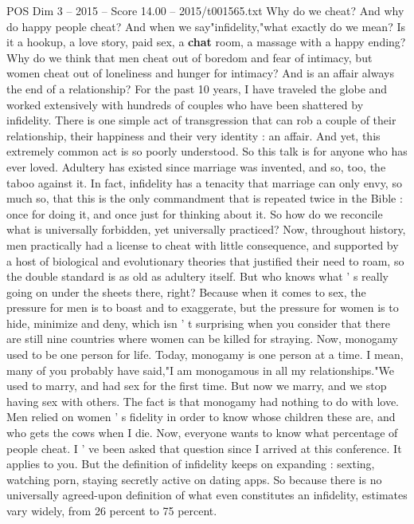 \begin{textsample}{POS Dim 3 – 2015 – Score 14.00 – 2015/t001565.txt}  \label{ex:f3_pos_033}
Why do we cheat?
And why do happy people cheat?
And when we say"infidelity,"what exactly do we mean?
Is it a hookup, a love story, paid sex, a \textbf{chat} room, a massage with a happy ending?
Why do we think that men cheat out of boredom and fear of intimacy, but women cheat out of loneliness and hunger for intimacy?
And is an affair always the end of a relationship?
For the past 10 years, I have traveled the globe and worked extensively with hundreds of couples who have been shattered by infidelity.
There is one simple act of transgression that can rob a couple of their relationship, their happiness and their very identity : an affair.
And yet, this extremely common act is so poorly understood.
So this talk is for anyone who has ever loved.
Adultery has existed since marriage was invented, and so, too, the taboo against it.
In fact, infidelity has a tenacity that marriage can only envy, so much so, that this is the only commandment that is repeated twice in the Bible : once for doing it, and once just for thinking about it.
So how do we reconcile what is universally forbidden, yet universally practiced?
Now, throughout history, men practically had a license to cheat with little consequence, and supported by a host of biological and evolutionary theories that justified their need to roam, so the double standard is as old as adultery itself.
But who knows what ' s really going on under the sheets there, right?
Because when it comes to sex, the pressure for men is to boast and to exaggerate, but the pressure for women is to hide, minimize and deny, which isn ' t surprising when you consider that there are still nine countries where women can be killed for straying.
Now, monogamy used to be one person for life.
Today, monogamy is one person at a time.
I mean, many of you probably have said,"I am monogamous in all my relationships."We used to marry, and had sex for the first time.
But now we marry, and we stop having sex with others.
The fact is that monogamy had nothing to do with love.
Men relied on women ' s fidelity in order to know whose children these are, and who gets the cows when I die.
Now, everyone wants to know what percentage of people cheat.
I ' ve been asked that question since I arrived at this conference.
It applies to you.
But the definition of infidelity keeps on expanding : sexting, watching porn, staying secretly active on dating apps.
So because there is no universally agreed-upon definition of what even constitutes an infidelity, estimates vary widely, from 26 percent to 75 percent.

\end{textsample}

